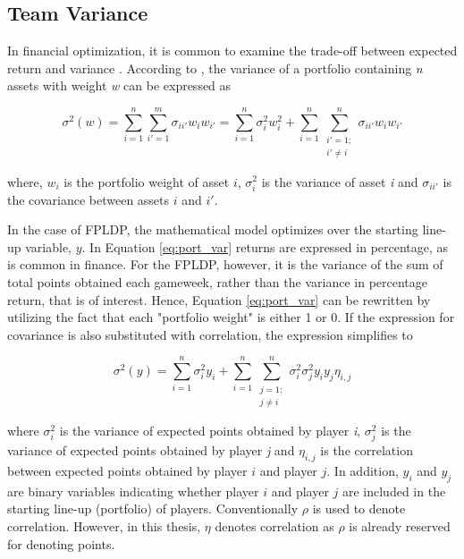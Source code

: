 \subsection{Team Variance}

In financial optimization, it is common to examine the trade-off between expected return and variance \citep{Markowitz}. According to \cite{Zenios}, the variance of a portfolio containing \textit{n} assets with weight \textit{w} can be expressed as 

\begin{equation}
    \sigma^2(w) = \sum_{i = 1}^{n}\sum_{i' = 1}^{m}\sigma_{ii'}w_{i}w_{i'} = \sum_{i = 1}^{n}\sigma_{i}^2w_i^2 + \sum_{i = 1}^{n}\sum_{\substack{i' = 1;\\ i' \neq i}}^{n}\sigma_{ii'}w_iw_{i'}
    \label{eq:port_var}
\end{equation}

where, $w_i$ is the portfolio weight of asset $i$, $\sigma_{i}^2$ is the variance of asset \textit{i} and $\sigma_{ii'}$ is the covariance between assets $i$ and $i'$. 

\newpar

In the case of FPLDP, the mathematical model optimizes over the starting line-up variable, $y$. In Equation \ref{eq:port_var} returns are expressed in percentage, as is common in finance.  
For the FPLDP, however, it is the variance of the sum of total points obtained each gameweek, rather than the variance in percentage return, that is of interest. Hence, Equation \ref{eq:port_var} can be rewritten by utilizing the fact that each "portfolio weight" is either 1 or 0. If the expression for covariance is also substituted with correlation, the expression simplifies to


\begin{equation}
    \sigma^2(y) = \sum_{i = 1}^{n}\sigma_i^2y_i + \sum_{i = 1}^{n}\sum_{\substack{j = 1;\\ j \neq i}}^{n} \sigma_i^{2}\sigma_j^{2}y_{i}y_{j}\eta_{i,j}
    \label{eq:team_var}
\end{equation}

where $\sigma_{i}^2$ is the variance of expected points obtained by player \textit{i}, $\sigma_{j}^2$ is the variance of expected points obtained by player \textit{j} and $\eta_{i,j}$ is the correlation between expected points obtained by player $i$ and player $j$. In addition, $y_i$ and $y_j$ are binary variables indicating whether player $i$ and player $j$ are included in the starting line-up (portfolio) of players. Conventionally $\rho$ is used to denote correlation. However, in this thesis, $\eta$ denotes correlation as $\rho$ is already reserved for denoting points.


